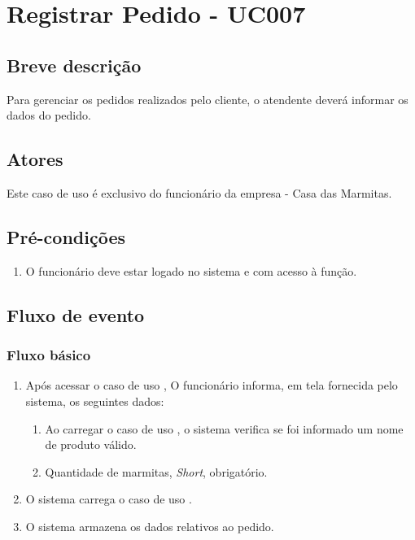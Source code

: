 \chapter{Registrar Pedido - UC007} \label{uc007}

\section{Breve descrição}

Para gerenciar os pedidos realizados pelo cliente, o atendente deverá informar os dados do pedido.

\section{Atores}

Este caso de uso é exclusivo do funcionário da empresa - Casa das Marmitas.

\section{Pré-condições}

\begin{enumerate}
	\item O funcionário deve estar logado no sistema e com acesso à função.
\end{enumerate}

\section{Fluxo de evento}

\subsection{Fluxo básico}

\begin{enumerate}
	\item Após acessar o caso de uso , O funcionário informa, em tela fornecida pelo sistema, os seguintes dados:
	\begin{enumerate}
		\item Ao carregar o caso de uso , o sistema verifica se foi informado um nome de produto válido.
		\item Quantidade de marmitas, \emph{Short}, obrigatório.		
	\end{enumerate}
	\item O sistema carrega o caso de uso .
	\item O sistema armazena os dados relativos ao pedido.
\end{enumerate}

